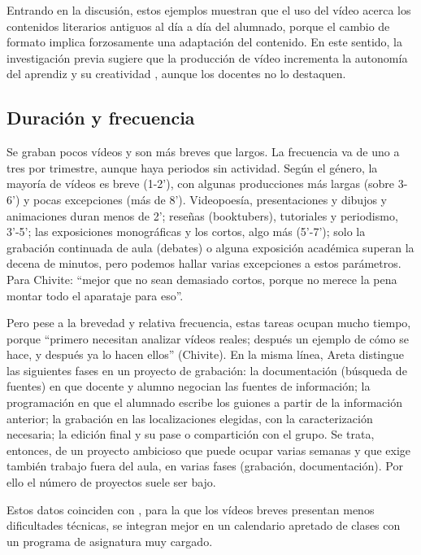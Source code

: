 \documentclass[spanish]{textolivre}
\begin{document}
Entrando en la discusión, estos ejemplos muestran que el uso del vídeo acerca los contenidos literarios antiguos al día a día del alumnado, porque el cambio de formato implica forzosamente una adaptación del contenido. En este sentido, la investigación previa sugiere que la producción de vídeo incrementa la autonomía del aprendiz \cite{vasquez_bustamante_aprendizaje_2013,oechsler_mathematical_2020} y su creatividad \cite{yeh_exploring_2018}, aunque los docentes no lo destaquen.

\subsection{Duración y frecuencia}\label{sec-organizacao-latex}
Se graban pocos vídeos y son más breves que largos. La frecuencia va de uno a tres por trimestre, aunque haya periodos sin actividad. Según el género, la mayoría de vídeos es breve (1-2’), con algunas producciones más largas (sobre 3-6’) y pocas excepciones (más de 8’). Videopoesía, presentaciones y dibujos y animaciones duran menos de 2’; reseñas (booktubers), tutoriales y periodismo, 3’-5’; las exposiciones monográficas y los cortos, algo más (5’-7’); solo la grabación continuada de aula (debates) o alguna exposición académica superan la decena de minutos, pero podemos hallar varias excepciones a estos parámetros. Para Chivite: “mejor que no sean demasiado cortos, porque no merece la pena montar todo el aparataje para eso”.

Pero pese a la brevedad y relativa frecuencia, estas tareas ocupan mucho tiempo, porque “primero necesitan analizar vídeos reales; después un ejemplo de cómo se hace, y después ya lo hacen ellos” (Chivite). En la misma línea, Areta distingue las siguientes fases en un proyecto de grabación: la documentación (búsqueda de fuentes) en que docente y alumno negocian las fuentes de información; la programación en que el alumnado escribe los guiones a partir de la información anterior; la grabación en las localizaciones elegidas, con la caracterización necesaria; la edición final y su pase o compartición con el grupo. Se trata, entonces, de un proyecto ambicioso que puede ocupar varias semanas y que exige también trabajo fuera del aula, en varias fases (grabación, documentación). Por ello el número de proyectos suele ser bajo.

Estos datos coinciden con \textcite{nikitina_video-making_2010}, para la que los vídeos breves presentan menos dificultades técnicas, se integran mejor en un calendario apretado de clases con un programa de asignatura muy cargado.
\end{document}
